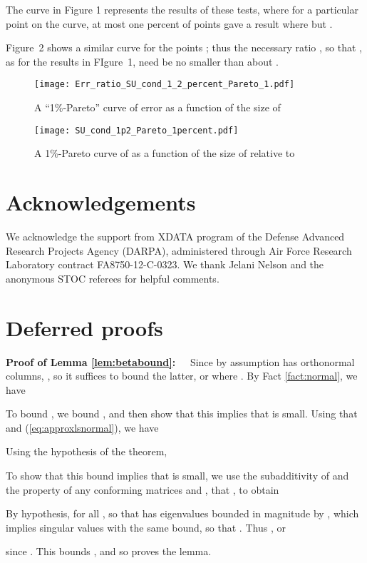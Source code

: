 \documentclass{sig-alternate}
\def\FullBox{\hbox{\vrule width 8pt height 8pt depth 0pt}}
\def\qed{\ifmmode\qquad\FullBox\else{\unskip\nobreak\hfil
\penalty50\hskip1em\null\nobreak\hfil\FullBox
\parfillskip=0pt\finalhyphendemerits=0\endgraf}\fi}
\newenvironment{proofof}[1]{\begin{trivlist} \item {\bf Proof
#1:~~}}
  {\qed\end{trivlist}}
\begin{document}
The curve in Figure 1 represents the results of these tests, where for a particular point
 on the curve, at most one percent of points  gave a result where
 but .

Figure~2 shows a similar curve for the points ; thus the necessary
ratio , so that , as for the results in FIgure~1, need be no smaller than
about .



\begin{figure*}
\begin{center}
  \texttt{[image: Err\_ratio\_SU\_cond\_1\_2\_percent\_Pareto\_1.pdf]} 
 \end{center}
\caption{A ``1\%-Pareto'' curve of error as a function of the size of }
\end{figure*}

\begin{figure*}
\begin{center}
  \texttt{[image: SU\_cond\_1p2\_Pareto\_1percent.pdf]} 
 \end{center}
\caption{A 1\%-Pareto curve of   as a function of the size of  relative to }
\end{figure*}





\fi 




\section*{Acknowledgements}
We acknowledge the support from XDATA program of the Defense Advanced Research Projects Agency (DARPA), administered through Air Force Research Laboratory contract FA8750-12-C-0323.
We thank Jelani Nelson and the anonymous STOC referees for helpful comments.







\ifSTOC\else
\appendix

\section{Deferred proofs}

\begin{proofof}{of Lemma \ref{lem:betabound}}
Since by assumption  has orthonormal columns,
,
so it suffices to bound the latter, or  where
.
By Fact \ref{fact:normal}, we have 

To bound , we bound
, and then show that
this implies that  is small.
Using that  and (\ref{eq:approxlsnormal}), we have

Using the hypothesis of the theorem, 

To show that this bound implies that 
is small, we use the subadditivity of  and
the property of any conforming matrices  and ,
that ,
to obtain

By hypothesis,
 for all ,
so that  has eigenvalues bounded in magnitude by ,
which implies singular values with the same bound, so that 
.
Thus
,
or

since . This bounds ,
and so proves the lemma.
\end{proofof}
\end{document}
